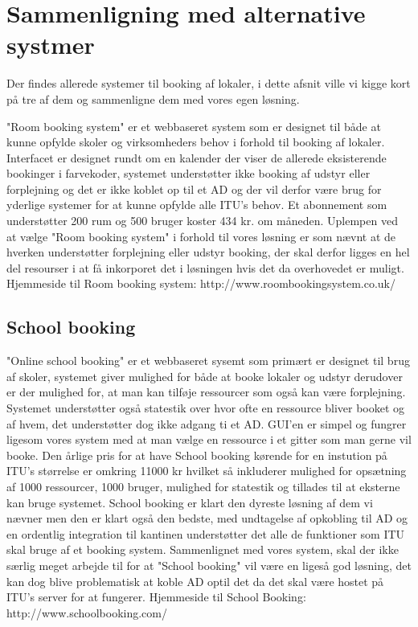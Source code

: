 \section{Sammenligning med alternative systmer}
Der findes allerede systemer til booking af lokaler, i dette afsnit ville vi kigge kort på tre af dem og sammenligne dem med vores egen løsning.

"Room booking system" er et webbaseret system som er designet til både at kunne opfylde skoler og virksomheders behov i forhold til booking af lokaler. Interfacet er designet rundt om en kalender der viser de allerede eksisterende bookinger i farvekoder, systemet understøtter ikke booking af udstyr eller forplejning og det er ikke koblet op til et AD og der vil derfor være brug for yderlige systemer for at kunne opfylde alle ITU's behov. Et abonnement som understøtter 200 rum og 500 bruger koster 434 kr. om måneden. Uplempen ved at vælge "Room booking system" i forhold til vores løsning er som nævnt at de hverken understøtter forplejning eller udstyr booking, der skal derfor ligges en hel del resourser i at få inkorporet det i løsningen hvis det da overhovedet er muligt.
Hjemmeside til Room booking system: http://www.roombookingsystem.co.uk/

\subsection{School booking}
"Online school booking" er et webbaseret sysemt som primært er designet til brug af skoler, systemet giver mulighed for både at booke lokaler og udstyr derudover er der mulighed for, at man kan tilføje ressourcer som også kan være forplejning. Systemet understøtter også statestik over hvor ofte en ressource bliver booket og af hvem, det understøtter dog ikke adgang ti et AD. GUI'en er simpel og fungrer ligesom vores system med at man vælge en ressource i et gitter som man gerne vil booke. Den årlige pris for at have School booking kørende for en instution på ITU's størrelse er omkring 11000 kr hvilket så inkluderer mulighed for opsætning af 1000 ressourcer, 1000 bruger, mulighed for statestik og tillades til at eksterne kan bruge systemet. School booking er klart den dyreste løsning af dem vi nævner men den er klart også den bedste, med undtagelse af opkobling til AD og en ordentlig integration til kantinen understøtter det alle de funktioner som ITU skal bruge af et booking system. Sammenlignet med vores system, skal der ikke særlig meget arbejde til for at "School booking" vil være en ligeså god løsning, det kan dog blive problematisk at koble AD optil det da det skal være hostet på ITU's server for at fungerer. 
Hjemmeside til School Booking: http://www.schoolbooking.com/

